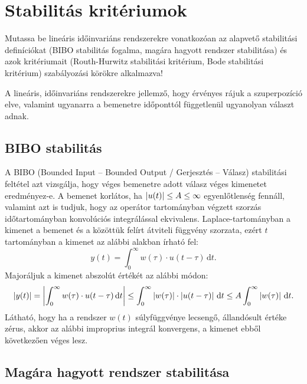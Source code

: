 \section{Stabilitás kritériumok}

\begin{about}
  Mutassa be lineáris időinvariáns rendszerekre vonatkozóan az alapvető
  stabilitási definíciókat (BIBO stabilitás fogalma, magára hagyott rendszer
  stabilitása) és azok kritériumait (Routh-Hurwitz stabilitási kritérium, Bode
  stabilitási kritérium) szabályozási körökre alkalmazva!
\end{about}

A lineáris, időinvariáns rendszerekre jellemző, hogy érvényes rájuk a
szuperpozíció elve, valamint ugyanarra a bemenetre időponttól függetlenül
ugyanolyan választ adnak.

\subsection{BIBO stabilitás}

A BIBO (Bounded Input -- Bounded Output / Gerjesztés -- Válasz) stabilitási
feltétel azt vizsgálja, hogy véges bemenetre adott válasz véges kimenetet
eredményez-e. A bemenet korlátos, ha $\left|u(t)\right| \leq A \le \infty$
egyenlőtlenség fennáll, valamint azt is tudjuk, hogy az operátor tartományban
végzett szorzás időtartományban konvolúciós integrálással ekvivalens.
Laplace-tartományban a kimenet a bemenet és a közöttük felírt átviteli függvény
szorzata, ezért $t$ tartományban a kimenet az alábbi alakban írható fel:
\begin{equation}
  y(t)
  = \int_0^\infty w(\tau) \cdot u(t - \tau) \, \mathrm d t.
  \label{eq:BIBO-conv}
\end{equation}
Majoráljuk a kimenet abszolút értékét az alábbi módon:
\begin{equation}
  \left|y(t)\right|
  = \left|\int_0^\infty w(\tau) \cdot u(t - \tau) \, \mathrm d t\right|
  \leq \int_0^\infty \left|w(\tau)\right| \cdot \left|u(t - \tau)\right| \, \mathrm d t
  \leq A \int_0^\infty \left|w(\tau)\right| \, \mathrm d t.
  \label{eq:BIBO-major}
\end{equation}
Látható, hogy ha a rendszer $w(t)$ súlyfüggvénye lecsengő, állandósult értéke
zérus, akkor az alábbi improprius integrál konvergens, a kimenet ebből
következően véges lesz.

\subsection{Magára hagyott rendszer stabilitása}

